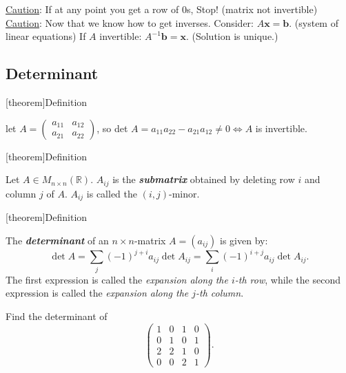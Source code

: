 \documentclass[12pt]{report}
\theoremstyle{definition}
\begin{document}
\underline{Caution}: If at any point you get a row of 0s, Stop! (matrix not invertible)
\underline{Caution}: Now that we know how to get inverses. Consider:
$A\mathbf{x} = \mathbf{b}$. (system of linear equations)
If $A$ invertible: $A^{-1}\mathbf{b} = \mathbf{x}$. (Solution is unique.)

\subsection{Determinant}

[theorem]{Definition}
\begin{determinant}
    let $A = \begin{pmatrix}
        a_{11} & a_{12} \\
        a_{21} & a_{22}
    \end{pmatrix} $,
    so det $A = a_{11}a_{22} - a_{21}a_{12}\neq 0 \iff A$ is invertible.
\end{determinant}

[theorem]{Definition}
\begin{submatrix}
    Let $A \in M_{n\times n} (\mathbb{R})$. $A_{ij}$ is the \textbf{\emph{submatrix}} obtained
    by deleting row $i$ and column $j$ of $A$. $A_{ij}$ is called the $(i,j)$-minor.
\end{submatrix}

[theorem]{Definition}
\begin{determinant of nxn matrix}
    The \textbf{\emph{determinant}} of an $n\times n$-matrix $A = (a_{ij})$ is given by:\[
        \det{A} = \sum_{j}^{} {(-1)}^{j + i} a_{ij} \det{A_{ij}}
        = \sum_{i}^{} {(-1)}^{i + j} a_{ij} \det{A_{ij}}.
    \]
    The first expression is called the \emph{expansion along the $i$-th row},
    while the second expression is called the \emph{expansion along the $j$-th column}.
\end{determinant of nxn matrix}

\begin{ex}
    Find the determinant of\[
        \begin{pmatrix}
            1 & 0 & 1 & 0 \\
            0 & 1 & 0 & 1 \\
            2 & 2 & 1 & 0 \\
            0 & 0 & 2 & 1
        \end{pmatrix}.
    \]
\end{ex}
\end{document}
